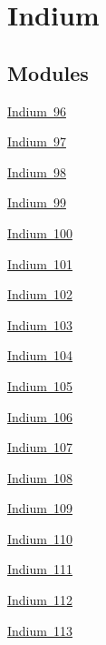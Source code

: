 \hypertarget{group___isotope_const-_indium}{}\section{Indium}
\label{group___isotope_const-_indium}
\subsection*{Modules}
\begin{DoxyCompactItemize}
\item 
\mbox{\hyperlink{group___isotope_const-_indium-_in96}{Indium 96}}
\item 
\mbox{\hyperlink{group___isotope_const-_indium-_in97}{Indium 97}}
\item 
\mbox{\hyperlink{group___isotope_const-_indium-_in98}{Indium 98}}
\item 
\mbox{\hyperlink{group___isotope_const-_indium-_in99}{Indium 99}}
\item 
\mbox{\hyperlink{group___isotope_const-_indium-_in100}{Indium 100}}
\item 
\mbox{\hyperlink{group___isotope_const-_indium-_in101}{Indium 101}}
\item 
\mbox{\hyperlink{group___isotope_const-_indium-_in102}{Indium 102}}
\item 
\mbox{\hyperlink{group___isotope_const-_indium-_in103}{Indium 103}}
\item 
\mbox{\hyperlink{group___isotope_const-_indium-_in104}{Indium 104}}
\item 
\mbox{\hyperlink{group___isotope_const-_indium-_in105}{Indium 105}}
\item 
\mbox{\hyperlink{group___isotope_const-_indium-_in106}{Indium 106}}
\item 
\mbox{\hyperlink{group___isotope_const-_indium-_in107}{Indium 107}}
\item 
\mbox{\hyperlink{group___isotope_const-_indium-_in108}{Indium 108}}
\item 
\mbox{\hyperlink{group___isotope_const-_indium-_in109}{Indium 109}}
\item 
\mbox{\hyperlink{group___isotope_const-_indium-_in110}{Indium 110}}
\item 
\mbox{\hyperlink{group___isotope_const-_indium-_in111}{Indium 111}}
\item 
\mbox{\hyperlink{group___isotope_const-_indium-_in112}{Indium 112}}
\item 
\mbox{\hyperlink{group___isotope_const-_indium-_in113}{Indium 113}}
\item 

\end{DoxyCompactItemize}

